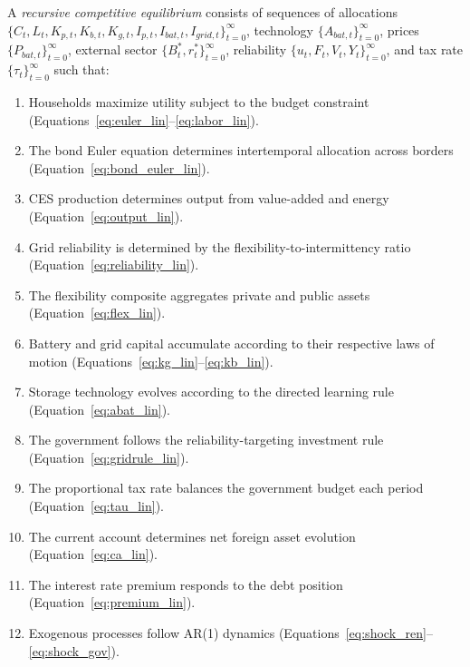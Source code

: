 \documentclass[12pt, a4paper]{article}
\begin{document}
A \textit{recursive competitive equilibrium} consists of sequences of allocations $\{C_t, L_t, K_{p,t}, K_{b,t}, K_{g,t}, I_{p,t}, I_{bat,t}, I_{grid,t}\}_{t=0}^{\infty}$, technology $\{A_{bat,t}\}_{t=0}^{\infty}$, prices $\{P_{bat,t}\}_{t=0}^{\infty}$, external sector $\{B^*_t, r^*_t\}_{t=0}^{\infty}$, reliability $\{u_t, F_t, V_t, Y_t\}_{t=0}^{\infty}$, and tax rate $\{\tau_t\}_{t=0}^{\infty}$ such that:
\begin{enumerate}
    \item Households maximize utility subject to the budget constraint (Equations~\ref{eq:euler_lin}--\ref{eq:labor_lin}).
    \item The bond Euler equation determines intertemporal allocation across borders (Equation~\ref{eq:bond_euler_lin}).
    \item CES production determines output from value-added and energy (Equation~\ref{eq:output_lin}).
    \item Grid reliability is determined by the flexibility-to-intermittency ratio (Equation~\ref{eq:reliability_lin}).
    \item The flexibility composite aggregates private and public assets (Equation~\ref{eq:flex_lin}).
    \item Battery and grid capital accumulate according to their respective laws of motion (Equations~\ref{eq:kg_lin}--\ref{eq:kb_lin}).
    \item Storage technology evolves according to the directed learning rule (Equation~\ref{eq:abat_lin}).
    \item The government follows the reliability-targeting investment rule (Equation~\ref{eq:gridrule_lin}).
    \item The proportional tax rate balances the government budget each period (Equation~\ref{eq:tau_lin}).
    \item The current account determines net foreign asset evolution (Equation~\ref{eq:ca_lin}).
    \item The interest rate premium responds to the debt position (Equation~\ref{eq:premium_lin}).
    \item Exogenous processes follow AR(1) dynamics (Equations~\ref{eq:shock_ren}--\ref{eq:shock_gov}).
\end{enumerate}
\end{document}
